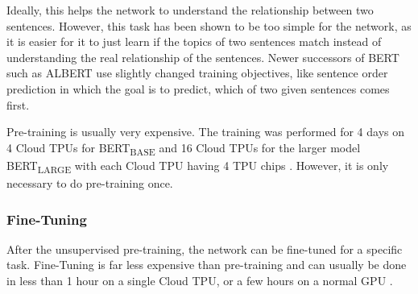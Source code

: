 Ideally, this helps the network to understand the relationship between two sentences.
However, this task has been shown to be too simple for the network, as it is easier for it to just learn if the topics of two sentences match instead of understanding the real relationship of the sentences.
Newer successors of BERT such as ALBERT use slightly changed training objectives, like sentence order prediction \cite[p.~3]{1909.11942} in which the goal is to predict, which of two given sentences comes first.

Pre-training is usually very expensive.
The training was performed for 4 days on 4 Cloud TPUs for BERT\textsubscript{BASE} and 16 Cloud TPUs for the larger model BERT\textsubscript{LARGE} with each Cloud TPU having 4 TPU chips \cite[p.~13]{devlin2018bert}.
However, it is only necessary to do pre-training once.

\subsubsection{Fine-Tuning}

After the unsupervised pre-training, the network can be fine-tuned for a specific task.
Fine-Tuning is far less expensive than pre-training and can usually be done in less than 1 hour on a single Cloud TPU, or a few hours on a normal GPU \cite[p.~5]{devlin2018bert}.
